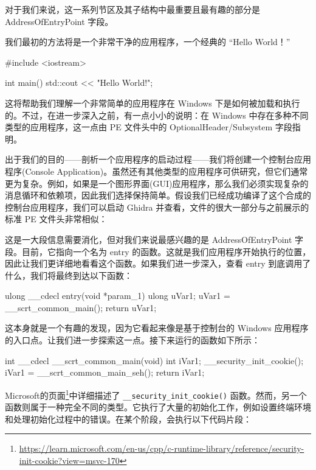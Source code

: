 对于我们来说，这一系列节区及其子结构中最重要且最有趣的部分是 AddressOfEntryPoint 字段。


我们最初的方法将是一个非常干净的应用程序，一个经典的 “Hello World！”

\begin{cpp}
#include <iostream>

int main() {
  std::cout << "Hello World!\n";
}
\end{cpp}

这将帮助我们理解一个非常简单的应用程序在 Windows 下是如何被加载和执行的。不过，在进一步深入之前，有一点小小的说明：在 Windows 中存在多种不同类型的应用程序，这一点由 PE 文件头中的 OptionalHeader/Subsystem 字段指明。

出于我们的目的——剖析一个应用程序的启动过程——我们将创建一个控制台应用程序(Console Application)。虽然还有其他类型的应用程序可供研究，但它们通常更为复杂。例如，如果是一个图形界面(GUI)应用程序，那么我们必须实现复杂的消息循环和依赖项，因此我们选择保持简单。假设我们已经成功编译了这个合成的控制台应用程序，我们可以启动 Ghidra 并查看，文件的很大一部分与之前展示的标准 PE 文件头非常相似：


这是一大段信息需要消化，但对我们来说最感兴趣的是 AddressOfEntryPoint 字段。目前，它指向一个名为 entry 的函数。这就是我们应用程序开始执行的位置，因此让我们更详细地看看这个函数。如果我们进一步深入，查看 entry 到底调用了什么，我们将最终到达以下函数：

\begin{cpp}
ulong __cdecl entry(void *param_1) {
  ulong uVar1;
  uVar1 = __scrt_common_main();
  return uVar1;
}
\end{cpp}

这本身就是一个有趣的发现，因为它看起来像是基于控制台的 Windows 应用程序的入口点。让我们进一步探索这一点。接下来运行的函数如下所示：

\begin{cpp}
int __cdecl __scrt_common_main(void) {
  int iVar1;
  __security_init_cookie();
  iVar1 = __scrt_common_main_seh();
  return iVar1;
}
\end{cpp}

Microsoft的页面\footnote{\url{https://learn.microsoft.com/en-us/cpp/c-runtime-library/reference/security-init-cookie?view=msvc-170}}中详细描述了 \verb|__security_init_cookie()| 函数。然而，另一个函数则属于一种完全不同的类型。它执行了大量的初始化工作，例如设置终端环境和处理初始化过程中的错误。在某个阶段，会执行以下代码片段：

